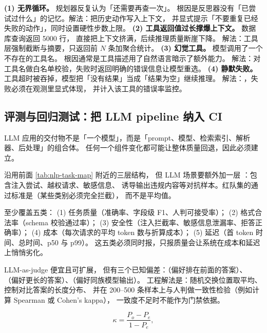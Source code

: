 \begin{pitfall}
\textbf{(1) 无界循环。} 规划器反复认为「还需要再查一次」。
根因是反思器没有「已尝试过什么」的记忆。解法：把历史动作写入上下文，
并显式提示「不要重复已经失败的动作」，同时设置硬性步数上限。
\textbf{(2) 工具返回值过长撑爆上下文。} 数据库查询返回 5000 行，
直接把上下文挤满，后续推理质量断崖下降。
解法：工具层强制截断与摘要，只返回前 $N$ 条加聚合统计。
\textbf{(3) 幻觉工具。} 模型调用了一个不存在的工具名。
根因通常是工具描述用了自然语言暗示了额外能力。
解法：对工具名做白名单校验，失败时返回明确的错误信息让模型重选。
\textbf{(4) 静默失败。} 工具超时被吞掉，模型把「没有结果」当成「结果为空」继续推理。
解法：，失败必须在观测里显式体现，
并计入该工具的错误率监控。
\end{pitfall}

\subsection{评测与回归测试：把 LLM pipeline 纳入 CI}

LLM 应用的交付物不是「一个模型」，而是「prompt、模型、检索索引、解析器、后处理」的组合体。
任何一个组件变化都可能让整体质量回退，因此必须建立。

 沿用前面 \cref{tab:nlp-task-map} 附近的三层结构，
但 LLM 场景要额外加一层 ：包含注入尝试、越权请求、敏感信息、
诱导输出违规内容等对抗样本。红队集的通过标准是（某些类别必须完全拦截），
而不是平均值。

 至少覆盖五类：
(1) 任务质量（准确率、字段级 F1、人判可接受率）；
(2) 格式合法率（schema 校验通过率）；
(3) 安全性（注入拦截率、敏感信息泄漏率、拒答正确率）；
(4) 成本（每次请求的平均 token 数与折算成本）；
(5) 延迟（首 token 时间、总时间、p50 与 p99）。
这五类必须同时报，只报质量会让系统在成本和延迟上悄悄劣化。

 LLM-as-judge 便宜且可扩展，
但有三个已知偏差：（偏好排在前面的答案）、
（偏好更长的答案）、（偏好同族模型输出）。
工程解法是：随机交换位置取平均、控制对比答案的长度分布、
并在 200--500 条样本上与人判做一致性检验（例如计算 Spearman 或 Cohen's kappa），
一致度不足时不能作为门禁依据。

\begin{equation}
\kappa = \frac{P_o - P_e}{1 - P_e},
\label{eq:kappa}
\end{equation}

